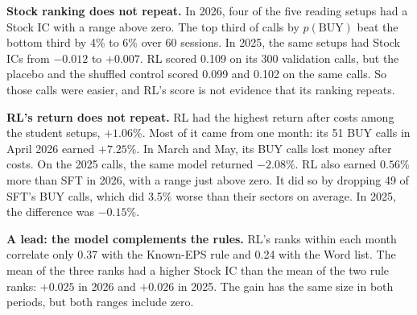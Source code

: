 \documentclass[sigconf,nonacm]{acmart}
\begin{document}
\textbf{Stock ranking does not repeat.}
In 2026, four of the five reading setups had a Stock IC with a range above zero.
The top third of calls by $p(\text{BUY})$ beat the bottom third by 4\% to 6\% over 60 sessions.
In 2025, the same setups had Stock ICs from $-0.012$ to $+0.007$.
RL scored 0.109 on its 300 validation calls, but the placebo and the shuffled control scored 0.099 and 0.102 on the same calls.
So those calls were easier, and RL's score is not evidence that its ranking repeats.

\textbf{RL's return does not repeat.}
RL had the highest return after costs among the student setups, $+1.06\%$.
Most of it came from one month: its 51 BUY calls in April 2026 earned $+7.25\%$.
In March and May, its BUY calls lost money after costs.
On the 2025 calls, the same model returned $-2.08\%$.
RL also earned $0.56\%$ more than SFT in 2026, with a range just above zero.
It did so by dropping 49 of SFT's BUY calls, which did 3.5\% worse than their sectors on average.
In 2025, the difference was $-0.15\%$.

\textbf{A lead: the model complements the rules.}
RL's ranks within each month correlate only 0.37 with the Known-EPS rule and 0.24 with the Word list.
The mean of the three ranks had a higher Stock IC than the mean of the two rule ranks: $+0.025$ in 2026 and $+0.026$ in 2025.
The gain has the same size in both periods, but both ranges include zero.
\end{document}
